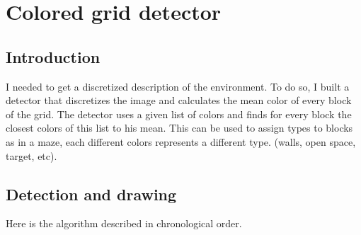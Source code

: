 \section{Colored grid detector}
\label{sec:cgd}

\subsection{Introduction}
\label{sec:cgd:intro}
I needed to get a discretized description of the environment. To do so, 
I built a detector that discretizes the image and calculates the mean 
color of every block of the grid. The detector uses a given list of 
colors and finds for every block the closest colors of this list to his 
mean. This can be used to assign types to blocks as in a maze, each 
different colors represents a different type. (walls, open space, 
target, etc).

\subsection{Detection and drawing}
\label{sec:cgd:algo}
Here is the algorithm described in chronological order.

